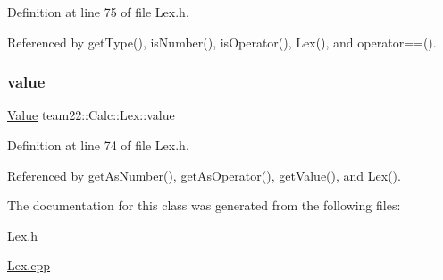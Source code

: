 Definition at line 75 of file Lex.\+h.



Referenced by get\+Type(), is\+Number(), is\+Operator(), Lex(), and operator==().

\mbox{\label{classteam22_1_1_calc_1_1_lex_a8a78a736b719931cada0905ac13fedc8}} 
\subsubsection{\texorpdfstring{value}{value}}
{\footnotesize\ttfamily \hyperlink{unionteam22_1_1_calc_1_1_lex_1_1_value}{Value} team22\+::\+Calc\+::\+Lex\+::value\hspace{0.3cm}{\ttfamily [protected]}}



Definition at line 74 of file Lex.\+h.



Referenced by get\+As\+Number(), get\+As\+Operator(), get\+Value(), and Lex().



The documentation for this class was generated from the following files\+:\begin{DoxyCompactItemize}
\item 
\hyperlink{_lex_8h}{Lex.\+h}\item 
\hyperlink{_lex_8cpp}{Lex.\+cpp}\end{DoxyCompactItemize}
